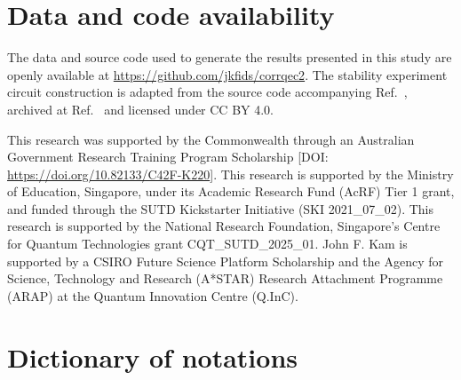 \documentclass[
    aps,
    prx,
    reprint,
    superscriptaddress,
    longbibliography,
    nofootinbib,
    floatfix,
]{revtex4-2}
\begin{document}
\section*{Data and code availability}
The data and source code used to generate the results presented in this study are openly available at \url{https://github.com/jkfids/corrqec2}. The stability experiment circuit construction is adapted from the source code accompanying Ref.~\cite{gidneyStabilityExperimentsOverlooked2022}, archived at Ref.~\cite{gidneyDataStabilityExperiments2022} and licensed under CC BY 4.0.

\begin{acknowledgments}
This research was supported by the Commonwealth through an Australian Government Research Training Program Scholarship [DOI: \url{https://doi.org/10.82133/C42F-K220}]. This research is supported by the Ministry of Education, Singapore, under its Academic Research Fund (AcRF) Tier 1 grant, and funded through the SUTD Kickstarter Initiative (SKI 2021\_07\_02). This research is supported by the National Research Foundation, Singapore's Centre for Quantum Technologies grant CQT\_SUTD\_2025\_01. John F. Kam is supported by a CSIRO Future Science Platform Scholarship and the Agency for Science, Technology and Research (A*STAR) Research Attachment Programme (ARAP) at the Quantum Innovation Centre (Q.InC).
\end{acknowledgments}




\appendix
{}

\onecolumngrid

\clearpage
\section{Dictionary of notations}\label{app:notations}
\newcommand{\paddedvalignbox}{\adjustbox{valign=c,padding=0 4.6pt}}
\end{document}
